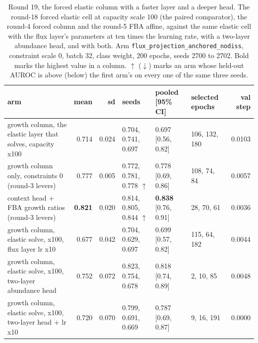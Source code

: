 \begin{table}[H]
  \centering
  \scriptsize
  \setlength{\tabcolsep}{3pt}
  \caption[Round 19, the forced elastic column with a faster layer and a deeper head]{Round 19, the forced elastic column with a faster layer and a deeper head. The round-18 forced elastic cell at capacity scale 100 (the paired comparator), the round-4 forced column and the round-5 FBA affine, against the same elastic cell with the flux layer's parameters at ten times the learning rate, with a two-layer abundance head, and with both. Arm \texttt{flux\_projection\_anchored\_nodiss}, constraint scale 0, batch 32, class weight, 200 epochs, seeds 2700 to 2702. Bold marks the highest value in a column. $\uparrow$ ($\downarrow$) marks an arm whose held-out AUROC is above (below) the first arm's on every one of the same three seeds.}
  \label{tab:w34}
  \begin{tabular}{@{}lrrlllr@{}}
    \hline
    arm & mean & sd & seeds & pooled [95\% CI] & selected epochs & val step \\
    \hline
    growth column, the elastic layer that solves, capacity x100 & 0.714 & 0.024 & 0.704, 0.741, 0.697 & 0.697 [0.56, 0.82] & 106, 132, 180 & 0.0103 \\
    growth column only, constraints 0 (round-3 levers) & 0.777 & 0.005 & 0.772, 0.781, 0.778 $\uparrow$ & 0.778 [0.69, 0.86] & 108, 74, 84 & 0.0057 \\
    context head $+$ FBA growth ratios (round-3 levers) & \textbf{0.821} & 0.020 & 0.814, 0.805, 0.844 $\uparrow$ & \textbf{0.838} [0.76, 0.91] & 28, 70, 61 & 0.0036 \\
    growth column, elastic solve, x100, flux layer lr x10 & 0.677 & 0.042 & 0.704, 0.629, 0.697 & 0.699 [0.57, 0.82] & 115, 64, 182 & 0.0044 \\
    growth column, elastic solve, x100, two-layer abundance head & 0.752 & 0.072 & 0.823, 0.754, 0.678 & 0.818 [0.74, 0.89] & 2, 10, 85 & 0.0048 \\
    growth column, elastic solve, x100, two-layer head $+$ lr x10 & 0.720 & 0.070 & 0.799, 0.691, 0.669 & 0.787 [0.69, 0.87] & 9, 16, 191 & 0.0000 \\
    \hline
  \end{tabular}
\end{table}
